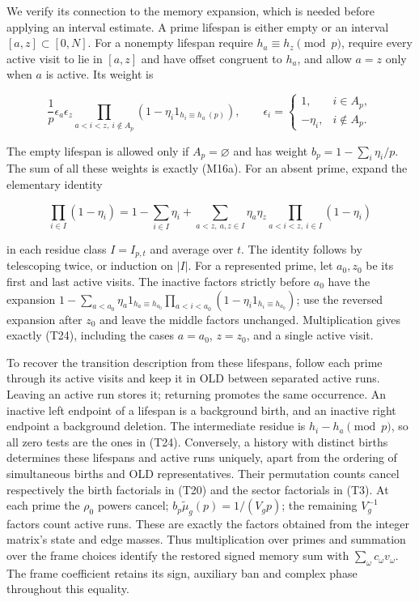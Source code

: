 We verify its connection to the memory expansion, which is needed before
applying an interval estimate. A prime lifespan is either empty or an
interval \([a,z]\subset[0,N]\). For a nonempty lifespan require
\(h_a\equiv h_z\pmod p\), require every active visit to lie in \([a,z]\)
and have offset congruent to \(h_a\), and allow \(a=z\) only when \(a\)
is active. Its weight is

\[
\frac1p\epsilon_a\epsilon_z
 \prod_{a<i<z,\ i\notin A_p}
       (1-\eta_i1_{h_i\equiv h_a\ (p)}),
\qquad
\epsilon_i=\begin{cases}1,&i\in A_p,\\-\eta_i,&i\notin A_p.\end{cases}
\tag{T24}
\]

The empty lifespan is allowed only if \(A_p=\varnothing\) and has weight
\(b_p=1-\sum_i\eta_i/p\). The sum of all these weights is exactly
(M16a). For an absent prime, expand the elementary identity

\[
\prod_{i\in I}(1-\eta_i)
 =1-\sum_{i\in I}\eta_i
  +\sum_{a<z,\ a,z\in I}\eta_a\eta_z
                      \prod_{a<i<z,\ i\in I}(1-\eta_i)
\tag{T25}
\]

in each residue class \(I=I_{p,t}\) and average over \(t\). The identity
follows by telescoping twice, or induction on \(|I|\). For a represented
prime, let \(a_0,z_0\) be its first and last active visits. The inactive
factors strictly before \(a_0\) have the expansion
\(1-\sum_{a<a_0}\eta_a1_{h_a\equiv h_{a_0}}  \prod_{a<i<a_0}(1-\eta_i1_{h_i\equiv h_{a_0}})\);
use the reversed expansion after \(z_0\) and leave the middle factors
unchanged. Multiplication gives exactly (T24), including the cases
\(a=a_0\), \(z=z_0\), and a single active visit.

To recover the transition description from these lifespans, follow each
prime through its active visits and keep it in OLD between separated
active runs. Leaving an active run stores it; returning promotes the
same occurrence. An inactive left endpoint of a lifespan is a background
birth, and an inactive right endpoint a background deletion. The
intermediate residue is \(h_i-h_a\pmod p\), so all zero tests are the
ones in (T24). Conversely, a history with distinct births determines
these lifespans and active runs uniquely, apart from the ordering of
simultaneous births and OLD representatives. Their permutation counts
cancel respectively the birth factorials in (T20) and the sector
factorials in (T3). At each prime the \(\rho_0\) powers cancel;
\(b_p\widetilde\mu_g(p)=1/(V_gp)\); the remaining \(V_g^{-1}\) factors
count active runs. These are exactly the factors obtained from the
integer matrix's state and edge masses. Thus multiplication over primes
and summation over the frame choices identify the restored signed memory
sum with \(\sum_\omega c_\omega v_\omega\). The frame coefficient
retains its sign, auxiliary ban and complex phase throughout this
equality.

